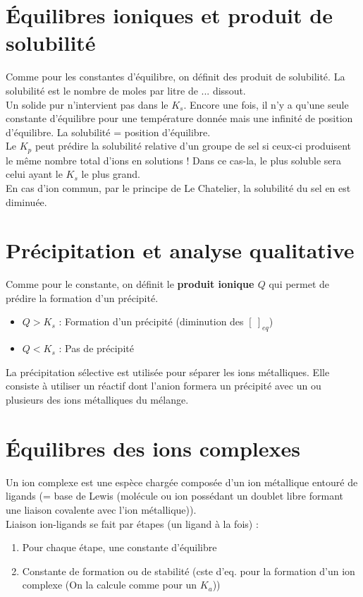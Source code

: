 \documentclass	[11pt, a4paper, openany]{book}
\begin{document}
\section{Équilibres ioniques et produit de solubilité}
Comme pour les constantes d'équilibre, on définit des produit de solubilité. La solubilité est le nombre de moles par litre de ... dissout.\\
Un solide pur n'intervient pas dans le $K_s$. Encore une fois, il n'y a qu'une seule constante d'équilibre pour une température donnée mais une infinité de position d'équilibre. La solubilité = position d'équilibre. \\

Le $K_p$ peut prédire la solubilité relative d'un groupe de sel si ceux-ci produisent le même nombre total d'ions en solutions ! Dans ce cas-la, le plus soluble sera celui ayant le $K_s$ le plus grand.\\

En cas d'ion commun, par le principe de Le Chatelier, la solubilité du sel en est diminuée. 

\section{Précipitation et analyse qualitative}
Comme pour le constante, on définit le \textbf{produit ionique $Q$} qui permet de prédire la formation d'un précipité.
\begin{itemize}
	\item $Q > K_s$ : Formation d'un précipité (diminution des $[\ ]_{eq}$)
	\item $Q < K_s$ : Pas de précipité
\end{itemize}
La précipitation sélective est utilisée pour séparer les ions métalliques. Elle consiste à utiliser un réactif dont l'anion formera un précipité avec un ou plusieurs des ions métalliques du mélange. 

\section{Équilibres des ions complexes}
Un ion complexe est une espèce chargée composée d'un ion métallique entouré de ligands (= base de Lewis (molécule ou ion possédant un doublet libre formant une liaison covalente avec l'ion métallique)).\\
Liaison ion-ligands se fait par étapes (un ligand à la fois) :
\begin{enumerate}
	\item Pour chaque étape, une constante d'équilibre
	\item Constante de formation ou de stabilité (cste d'eq. pour la formation d'un ion complexe (On la calcule comme pour un $K_a$))
\end{enumerate}
\end{document}
